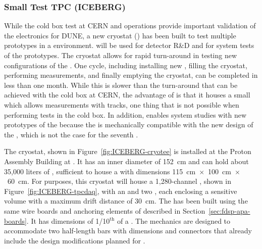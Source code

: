 
\subsubsection{Small Test TPC (ICEBERG)}
\label{sec:fdsp-tpcelec-qa-facilities-testtpc}

While the cold box test at CERN and  operations provide important 
validation of the  electronics for DUNE, a new cryostat () 
has been built to test multiple  prototypes in a  environment.
 will be used for 
 detector R\&D and for system tests of the  prototypes. 
The  cryostat allows for rapid turn-around in testing new configurations
of the . One cycle, including installing new , filling the cryostat,
performing measurements, and finally emptying the cryostat, can be completed in less than
one month. While this is slower than the turn-around that can be achieved with the
cold box at CERN, the advantage of  is that it houses a small  which
allows measurements with tracks, one thing that is not possible when performing
tests in the cold box. In addition,  enables system studies with new
prototypes of the  because the  is mechanically compatible with the 
new design of the , which is not the case for the seventh  .  

The  cryostat, shown in Figure~\ref{fig:ICEBERG-cryotee} is installed
at the Proton Assembly Building at . It has an inner diameter of \SI{152}{cm}
and can hold about 35,000 liters of , sufficient to house a
 with dimensions \SI{115}{cm}~$\times$~\SI{100}{cm}~$\times$~\SI{60}{cm}. For
 purposes, this cryostat will house a 1,280-channel , shown in
Figure~\ref{fig:ICEBERG-tpcdaq}, with an  and two , each 
enclosing a sensitive volume with a maximum drift distance of \SI{30}{cm}. The  
has been built using the same wire boards and anchoring elements of  
described in Section~\ref{sec:fdsp-apa-boards}. It has dimensions of 
1/10$^{\mathrm{th}}$ of a  . The  mechanics are designed to
accommodate two half-length  bars with dimensions and connectors that already 
include the design modifications planned for .

